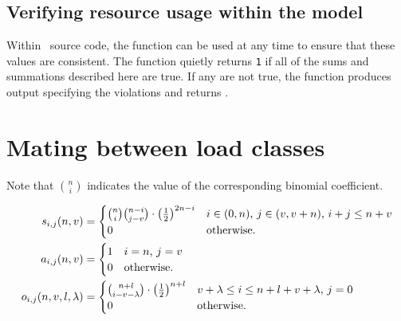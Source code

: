 \subsection{Verifying resource usage within the model}

Within \K\ source code, the function  can be used at any time to ensure that these values are consistent.  The function quietly returns {\tt 1} if all of the sums and summations described here are true.  If any are not true, the function produces output specifying the violations and returns . 

\section{Mating between load classes}

Note that $\binom{n}{i}$ indicates the value of the corresponding binomial coefficient. %

\begin{align}
\label{eq:matingK:s}
\mbox{$s_{i,j}(n,v)$} &=
  \begin{cases}
    \binom{n}{i}\binom{n-i}{j-v}\cdot\left({\frac{1}{2}}\right)^{2n-i} & \text{$i\in(0,n)$, $j\in(v,v + n)$, $i+j \leq n+v$} \\
    0                                                                  & \text{otherwise.} 
  \end{cases} \\
\label{eq:matingK:a}
\mbox{$a_{i,j}(n,v)$} &= 
  \begin{cases}
    1 & \text{$i=n$, $j=v$} \\
    0 & \text{otherwise.}  
  \end{cases} \\
\label{eq:matingK:o}
\mbox{$o_{i,j}(n,v,l,\lambda)$} &=
  \begin{cases}
    \binom{n+l}{i-v-\lambda}\cdot\left({\frac{1}{2}}\right)^{n+l} & \text{$v+\lambda \leq i \leq n+l+v+\lambda$, $j=0$} \\
    0                                                             & \text{otherwise.} 
  \end{cases} 
\end{align}

